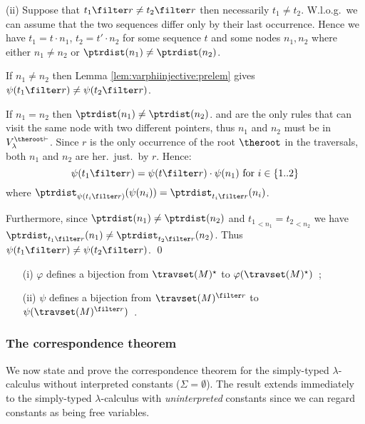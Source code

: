 \noindent (ii) Suppose that $t_1 \filter r \neq t_2 \filter r$ then
necessarily $t_1 \neq t_2$. W.l.o.g.\ we can assume that the two
sequences differ only by their last occurrence. Hence we have $t_1 =
t \cdot n_1$, $t_2 = t' \cdot n_2$ for some sequence $t$ and some
nodes $n_1, n_2$ where either $n_1\neq n_2$ or $\ptrdist(n_1) \neq
\ptrdist(n_2)$.

If $n_1 \neq n_2$ then Lemma \ref{lem:varphiinjective:prelem} gives
$\psi( t_1\filter r ) \neq \psi( t_2\filter r )$.

If $n_1 = n_2$ then $\ptrdist(n_1) \neq \ptrdist(n_2)$.
 and  are the only rules
that can visit the same node with two different pointers, thus $n_1$
and $n_2$ must be in $V_\lambda^{\theroot\vdash}$. Since $r$ is the
only occurrence of the root $\theroot$ in the traversals, both $n_1$
and $n_2$ are her.\ just.\ by $r$. Hence:
\begin{equation*}
\psi(t_1\filter r) = \psi(t\filter r) \cdot \psi(n_1) \mbox{ for $i
\in \{1..2\}$}
\end{equation*}
where $\ptrdist_{\psi(t_i\filter r)}(\psi(n_i)) =
\ptrdist_{t_i\filter r}(n_i)$.

Furthermore, since $\ptrdist(n_1) \neq \ptrdist(n_2)$ and
${t_1}_{<n_1} = {t_2}_{<n_2}$ we have $\ptrdist_{t_1\filter r}(n_1)
\neq \ptrdist_{t_2\filter r}(n_2)$. Thus $\psi(t_1\filter r) \neq
\psi(t_2\filter r)$. \qed


\begin{corollary} \hfill
\label{cor:varphi_bij}
\begin{itemize}
\item[(i)] $\varphi$ defines a bijection from $\travset(M)^\star$
to $\varphi(\travset(M)^\star)$\ ;
\item[(ii)] $\psi$ defines a bijection from $\travset(M)^{\filter r}$ to
$\psi(\travset(M)^{\filter r})$\ .
\end{itemize}
\end{corollary}

\subsubsection{The correspondence theorem}
We now state and prove the correspondence theorem for the
simply-typed $\lambda$-calculus without interpreted constants
($\Sigma = \emptyset$). The result extends immediately to the
simply-typed $\lambda$-calculus with \emph{uninterpreted} constants
since we can regard constants as being free variables.

